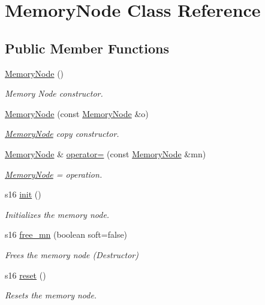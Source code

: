\hypertarget{class_memory_node}{}\section{Memory\+Node Class Reference}
\label{class_memory_node}
\subsection*{Public Member Functions}
\begin{DoxyCompactItemize}
\item 
\hyperlink{class_memory_node_a5b96575439c0b82ac4cfebf71209838a}{Memory\+Node} ()
\begin{DoxyCompactList}\small\item\em Memory Node constructor. \end{DoxyCompactList}\item 
\hyperlink{class_memory_node_a6d07a3f7d2594d9cc115015bba04ede9}{Memory\+Node} (const \hyperlink{class_memory_node}{Memory\+Node} \&o)
\begin{DoxyCompactList}\small\item\em \hyperlink{class_memory_node}{Memory\+Node} copy constructor. \end{DoxyCompactList}\item 
\hyperlink{class_memory_node}{Memory\+Node} \& \hyperlink{class_memory_node_a67adfa40cb3ccb63deb68491a31ec854}{operator=} (const \hyperlink{class_memory_node}{Memory\+Node} \&mn)
\begin{DoxyCompactList}\small\item\em \hyperlink{class_memory_node}{Memory\+Node} = operation. \end{DoxyCompactList}\item 
s16 \hyperlink{class_memory_node_a7d5525e6dc8c0c41e8d32a14534cf261}{init} ()
\begin{DoxyCompactList}\small\item\em Initializes the memory node. \end{DoxyCompactList}\item 
s16 \hyperlink{class_memory_node_abd62af9897dd0f29a1a06490fc2c7570}{free\+\_\+mn} (boolean soft=false)
\begin{DoxyCompactList}\small\item\em Frees the memory node (Destructor) \end{DoxyCompactList}\item 
s16 \hyperlink{class_memory_node_a705f9683b7f721e3fbc90b82bb1daacc}{reset} ()
\begin{DoxyCompactList}\small\item\em Resets the memory node. \end{DoxyCompactList}\item 

\end{DoxyCompactItemize}
